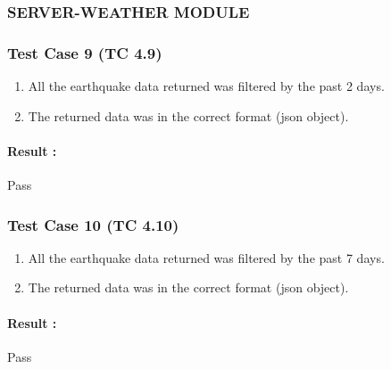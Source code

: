 \subsubsection*{SERVER-WEATHER MODULE}

\subsubsection{Test Case 9 (TC 4.9)}

\begin{enumerate}
	\item All the earthquake data returned was filtered by the past 2 days.
	\item The returned data was in the correct format (json object).
\end{enumerate}

\paragraph{Result :} Pass


\subsubsection{Test Case 10 (TC 4.10)}

\begin{enumerate}
	\item All the earthquake data returned was filtered by the past 7 days.
	\item The returned data was in the correct format (json object).
\end{enumerate}

\paragraph{Result :} Pass